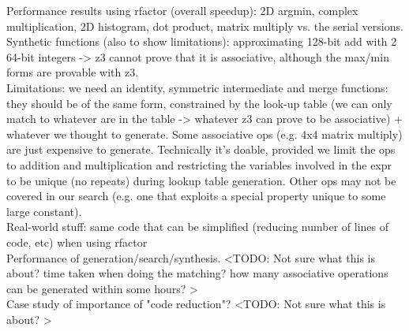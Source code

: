 Performance results using rfactor (overall speedup): 2D argmin, complex multiplication, 2D histogram, dot product, matrix multiply vs. the serial versions. \\

Synthetic functions (also to show limitations): approximating 128-bit add with 2 64-bit integers -> z3 cannot prove that it is associative, although the max/min forms are provable with z3. \\

Limitations: we need an identity, symmetric intermediate and merge functions: they should be of the same form, constrained by the look-up table (we can only match to whatever are in the table -> whatever z3 can prove to be associative) + whatever we thought to generate. Some associative ops (e.g. 4x4 matrix multiply) are just expensive to generate. Technically it's doable, provided we limit the ops to addition and multiplication and restricting the variables involved in the expr to be unique (no repeats) during lookup table generation. Other ops may not be covered in our search (e.g. one that exploits a special property unique to some large constant). \\

Real-world stuff: same code that can be simplified (reducing number of lines of code, etc) when using rfactor \\

Performance of generation/search/synthesis. <TODO: Not sure what this is about? time taken when doing the matching? how many associative operations can be generated within some hours? > \\

Case study of importance of "code reduction"? <TODO: Not sure what this is about? > \\ 
